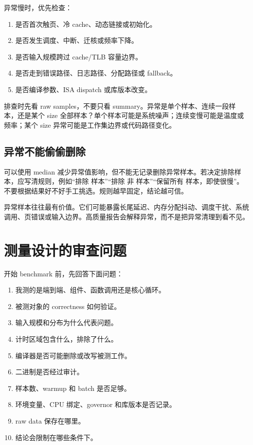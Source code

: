 异常慢时，优先检查：

\begin{enumerate}
  \item 是否首次触页、冷 cache、动态链接或初始化。
  \item 是否发生调度、中断、迁核或频率下降。
  \item 是否输入规模跨过 cache/TLB 容量边界。
  \item 是否走到错误路径、日志路径、分配路径或 fallback。
  \item 是否编译参数、ISA dispatch 或库版本改变。
\end{enumerate}

排查时先看 raw samples，不要只看 summary。异常是单个样本、连续一段样本，还是某个 size 全部样本？单个样本可能是系统噪声；连续变慢可能是温度或频率；某个 size 异常可能是工作集边界或代码路径变化。

\subsection{异常不能偷偷删除}

可以使用 median 减少异常值影响，但不能无记录删除异常样本。若决定排除样本，应写清规则，例如“排除  样本”“排除  非  样本”“保留所有  样本，即使很慢”。不要根据结果好不好手工挑选。规则越早固定，结论越可信。

异常样本往往最有价值。它们可能暴露长尾延迟、内存分配抖动、调度干扰、系统调用、页错误或输入边界。高质量报告会解释异常，而不是把异常清理到看不见。

\section{测量设计的审查问题}

开始 benchmark 前，先回答下面问题：

\begin{enumerate}
  \item 我测的是端到端、组件、函数调用还是核心循环。
  \item 被测对象的 correctness 如何验证。
  \item 输入规模和分布为什么代表问题。
  \item 计时区域包含什么，排除了什么。
  \item 编译器是否可能删除或改写被测工作。
  \item 二进制是否经过审计。
  \item 样本数、warmup 和 batch 是否足够。
  \item 环境变量、CPU 绑定、governor 和库版本是否记录。
  \item raw data 保存在哪里。
  \item 结论会限制在哪些条件下。
\end{enumerate}

